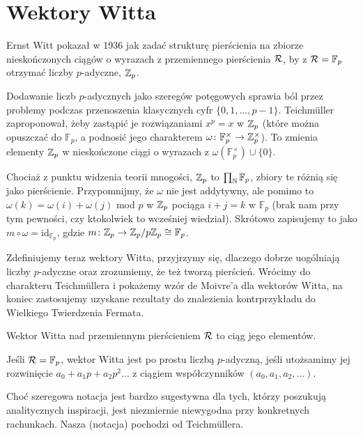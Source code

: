\section{Wektory Witta}
Ernst Witt pokazał w 1936 jak zadać strukturę pierścienia na zbiorze nieskończonych ciągów o wyrazach z przemiennego pierścienia $\mathcal R$, by z $\mathcal R = \mathbb F_p$ otrzymać liczby $p$-adyczne, $\mathbb Z_p$.

Dodawanie liczb $p$-adycznych jako szeregów potęgowych sprawia ból przez problemy podczas przenoszenia klasycznych cyfr $\{0, 1, \ldots, p-1\}$.
Teichmüller zaproponował, żeby zastąpić je rozwiązaniami $x^p = x$ w $\mathbb Z_p$ (które można opuszczać do $\mathbb F_p$, a podnosić jego charakterem $\omega \colon \mathbb F_p^\times \to \mathbb Z_p^\times$).
To zmienia elementy $\mathbb Z_p$ w nieskończone ciągi o wyrazach z $\omega(\mathbb{F}_p^\times) \cup \{0\}$.

Chociaż z punktu widzenia teorii mnogości, $\mathbb Z_p$ to $\prod_\mathbb N \mathbb F_p$, zbiory te różnią się jako pierścienie.
Przypomnijmy, że $\omega$ nie jest addytywny, ale pomimo to $\omega(k) = \omega(i) + \omega(j)$ mod $p$ w $\mathbb Z_p$ pociąga $i + j = k$ w $\mathbb F_p$ (brak nam przy tym pewności, czy ktokolwiek to wcześniej wiedział).
Skrótowo zapisujemy to jako $m \circ \omega = \mathrm{id}_{\mathbb F_p}$, gdzie $m \colon \mathbb Z_p \to \mathbb Z_p / p \mathbb Z_p \cong \mathbb F_p$.

Zdefiniujemy teraz wektory Witta, przyjrzymy się, dlaczego dobrze uogólniają liczby $p$-adyczne oraz zrozumiemy, że też tworzą pierścień.
Wrócimy do charakteru Teichmüllera i pokażemy wzór de Moivre'a dla wektorów Witta, na koniec zastosujemy uzyskane rezultaty do znalezienia kontrprzykładu do Wielkiego Twierdzenia Fermata.

\begin{definicja}
	Wektor Witta nad przemiennym pierścieniem $\mathcal R$ to ciąg jego elementów.
\end{definicja}

\begin{przyklad}
	Jeśli $\mathcal R = \mathbb F_p$, wektor Witta jest po prostu liczbą $p$-adyczną, jeśli utożsamimy jej rozwinięcie $a_0 + a_1p +  a_2 p^2\ldots$ z ciągiem współczynników $(a_0, a_1, a_2, \ldots)$.
\end{przyklad}

Choć szeregowa notacja jest bardzo sugestywna dla tych, którzy poszukują analitycznych inspiracji, jest niezmiernie niewygodna przy konkretnych rachunkach.
Nasza (notacja) pochodzi od Teichmüllera.

